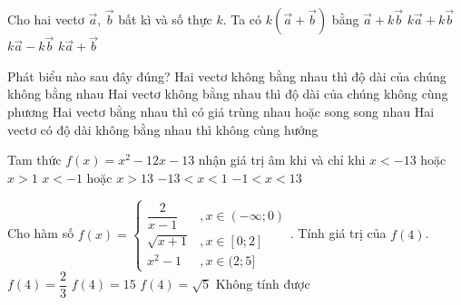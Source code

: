 \begin{ex}%
Cho hai vectơ  $\vec{a}$, $\vec{b}$ bất kì và số thực $k$. Ta có $k\left(\vec{a}+\vec{b}\right)$ bằng
\choice
{$\vec{a}+k \vec{b}$}
{\True $k \vec{a}+k \vec{b}$}
{$k \vec{a}-k \vec{b}$}
{$k \vec{a}+\vec{b}$}
\end{ex}

\begin{ex}%
Phát biểu nào sau đây đúng?
\choice
{Hai vectơ không bằng nhau thì độ dài của chúng không bằng nhau}
{Hai vectơ không bằng nhau thì độ dài của chúng không cùng phương}
{\True Hai vectơ bằng nhau thì có giá trùng nhau hoặc song song nhau}
{Hai vectơ có độ dài không bằng nhau thì không cùng hướng}
\end{ex}

\begin{ex}%
Tam thức $f(x)=x^2-12x-13$ nhận giá trị âm khi và chỉ khi
\choice
{$x<-13$ hoặc $x>1$}
{$x<-1$ hoặc $x>13$}
{$-13<x<1$}
{\True $-1<x<13$}
\end{ex}

\begin{ex}%
Cho hàm số $f(x)=\left\{\begin{array}{*{35}{l}}
\dfrac{2}{x-1} &, x\in(-\infty;0) \\
\sqrt{x+1} &, x\in[0;2] \\
x^2-1 &, x\in(2;5]
\end{array}\right.$. Tính giá trị của $f(4)$.
\choice
{$f(4)=\dfrac{2}{3}$}
{\True $f(4)=15$}
{$f(4)=\sqrt{5}$}
{Không tính được}
\loigiai{Do $4\in(2;5]$ nên $f(4)=4^2-1=15$.}
\end{ex}

